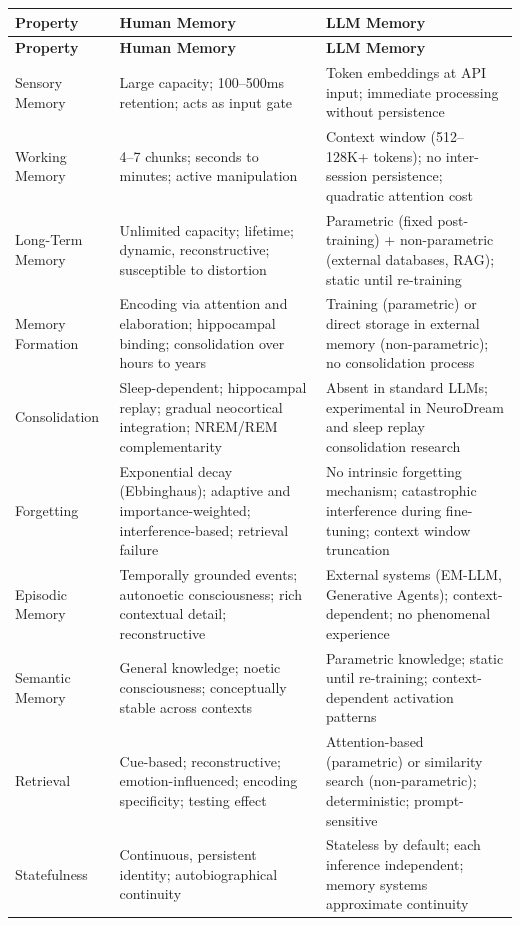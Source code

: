 \documentclass[11pt,letterpaper]{article}
\begin{document}
\begin{longtable}{p{3.5cm}p{4.5cm}p{5cm}}
\toprule
\textbf{Property} & \textbf{Human Memory} & \textbf{LLM Memory} \\
\midrule
\endfirsthead
\toprule
\textbf{Property} & \textbf{Human Memory} & \textbf{LLM Memory} \\
\midrule
\endhead
Sensory Memory & Large capacity; 100--500ms retention; acts as input gate & Token embeddings at API input; immediate processing without persistence \\
\midrule
Working Memory & 4--7 chunks; seconds to minutes; active manipulation & Context window (512--128K+ tokens); no inter-session persistence; quadratic attention cost \\
\midrule
Long-Term Memory & Unlimited capacity; lifetime; dynamic, reconstructive; susceptible to distortion & Parametric (fixed post-training) + non-parametric (external databases, RAG); static until re-training \\
\midrule
Memory Formation & Encoding via attention and elaboration; hippocampal binding; consolidation over hours to years & Training (parametric) or direct storage in external memory (non-parametric); no consolidation process \\
\midrule
Consolidation & Sleep-dependent; hippocampal replay; gradual neocortical integration; NREM/REM complementarity & Absent in standard LLMs; experimental in NeuroDream and sleep replay consolidation research \\
\midrule
Forgetting & Exponential decay (Ebbinghaus); adaptive and importance-weighted; interference-based; retrieval failure & No intrinsic forgetting mechanism; catastrophic interference during fine-tuning; context window truncation \\
\midrule
Episodic Memory & Temporally grounded events; autonoetic consciousness; rich contextual detail; reconstructive & External systems (EM-LLM, Generative Agents); context-dependent; no phenomenal experience \\
\midrule
Semantic Memory & General knowledge; noetic consciousness; conceptually stable across contexts & Parametric knowledge; static until re-training; context-dependent activation patterns \\
\midrule
Retrieval & Cue-based; reconstructive; emotion-influenced; encoding specificity; testing effect & Attention-based (parametric) or similarity search (non-parametric); deterministic; prompt-sensitive \\
\midrule
Statefulness & Continuous, persistent identity; autobiographical continuity & Stateless by default; each inference independent; memory systems approximate continuity \\

\end{longtable}
\end{document}
